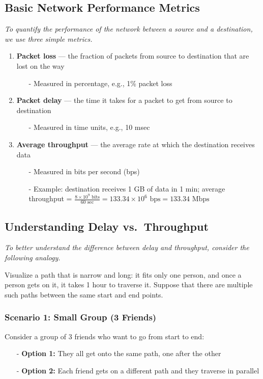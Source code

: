 \documentclass[../../compsys.tex]{subfiles}
\begin{document}
\subsection{Basic Network Performance Metrics}
\textit{To quantify the performance of the network between a source and a destination, we use three simple metrics.}

\begin{enumerate}
  \item \textbf{Packet loss} — the fraction of packets from source to destination that are lost on the way
  \begin{itemize}
    \item[-] Measured in percentage, e.g., 1\% packet loss
  \end{itemize}
  
  \item \textbf{Packet delay} — the time it takes for a packet to get from source to destination
  \begin{itemize}
    \item[-] Measured in time units, e.g., 10 msec
  \end{itemize}
  
  \item \textbf{Average throughput} — the average rate at which the destination receives data
  \begin{itemize}
    \item[-] Measured in bits per second (bps)
    \item[-] Example: destination receives 1 GB of data in 1 min; average throughput = \(\frac{8 \times 10^9 \text{ bits}}{60 \text{ sec}} = 133.34 \times 10^6 \text{ bps} = 133.34 \text{ Mbps}\)
  \end{itemize}
\end{enumerate}

\subsection{Understanding Delay vs.\ Throughput}
\textit{To better understand the difference between delay and throughput, consider the following analogy.}

Visualize a path that is narrow and long: it fits only one person, and once a person gets on it, it takes 1 hour to traverse it. Suppose that there are multiple such paths between the same start and end points.

\subsubsection{Scenario 1: Small Group (3 Friends)}
Consider a group of 3 friends who want to go from start to end:
\begin{itemize}
  \item[-] \textbf{Option 1:} They all get onto the same path, one after the other
  \item[-] \textbf{Option 2:} Each friend gets on a different path and they traverse in parallel
\end{itemize}
\end{document}
